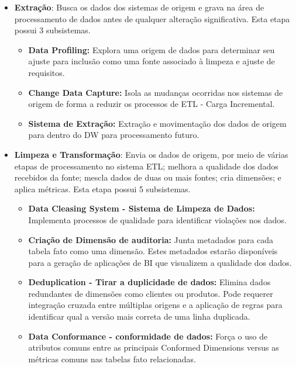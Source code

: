 \begin{itemize}
	\item \textbf{Extração}: Busca os dados dos sistemas de origem e grava na área de processamento de dados antes de qualquer alteração significativa. Esta etapa possui 3 subsistemas.
		\begin{itemize}
			\item \textbf{Data Profiling:} Explora uma origem de dados para determinar seu ajuste para inclusão como uma fonte associado à limpeza e ajuste de requisitos.
			\item \textbf{Change Data Capture:} Isola as mudanças ocorridas nos sistemas de origem de forma a reduzir os processos de ETL - Carga Incremental.
			\item \textbf{Sistema de Extração:} Extração e movimentação dos dados de origem para dentro do DW para processamento futuro.
		\end{itemize}
	
	\item \textbf{Limpeza e Transformação}: Envia os dados de origem, por meio de várias etapas de processamento no sistema ETL; melhora a qualidade dos dados recebidos da fonte; mescla dados de duas ou mais fontes; cria dimensões; e aplica métricas. Esta etapa possui 5 subsistemas.
		\begin{itemize}
			\item \textbf{Data Cleasing System - Sistema de Limpeza de Dados:}  Implementa processos de qualidade para identificar violações nos dados.
			\item \textbf{Criação de Dimensão de auditoria:} Junta metadados para cada tabela fato como uma dimensão. Estes metadados estarão disponíveis para a geração de aplicações de BI que visualizem  a qualidade dos dados.
			\item \textbf{Deduplication - Tirar a duplicidade de dados:} Elimina dados redundantes de dimensões como clientes ou produtos. Pode requerer integração cruzada entre múltiplas origens e a aplicação de regras para identificar qual a versão mais correta de uma linha duplicada.
			\item \textbf{Data Conformance - conformidade de dados:} Força o uso de atributos comuns entre as principais Conformed Dimensions versus as métricas comuns nas tabelas fato relacionadas.
		\end{itemize}
	

\end{itemize}
